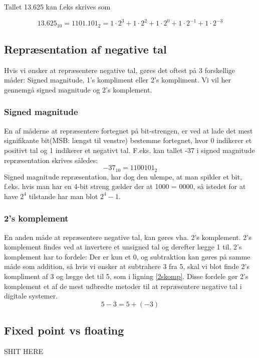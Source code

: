 Tallet 13.625 kan f.eks skrives som

\begin{equation}
13.625_{10} = 1101.101_2 = 1 \cdot 2^3+1 \cdot 2^2+1 \cdot 2^0+1 \cdot 2^{-1}+1 \cdot 2^{-3}
\end{equation}

\subsection{Repræsentation af negative tal}
Hvis vi ønsker at repræsentere negative tal, gøres det oftest på 3 forskellige måder: 
Signed magnitude, 1's kompliment eller 2's kompliment. Vi vil her gennemgå signed magnitude og 2's komplement.
\subsubsection{Signed magnitude}
En af måderne at repræsentere fortegnet på bit-strengen, er ved at lade det mest signifikante bit(MSB: længst til venstre) bestemme fortegnet, hvor 0 indikerer et positivt tal og 1 indikerer et negativt tal.  F.eks. kan tallet -37 i signed magnitude repræsentation skrives således:
\begin{equation}
-37_{10} = 1100101_2 
\end{equation}
Signed magnitude repræsentation, har dog den ulempe, at man spilder et bit, f.eks. hvis man har en 4-bit streng gælder der at 1000 =  0000, så istedet for at have $2^4$ tilstande har man blot $2^4-1$. 
\subsubsection{2's komplement}
En anden måde at repræsentere negative tal, kan gøres vha. 2's komplement. 2's komplement findes ved at invertere et unsigned tal og derefter lægge 1 til. 2's komplement har to fordele: Der er kun et 0, og subtraktion kan gøres på samme måde som addition, så hvis vi ønsker at subtrahere 3 fra 5, skal vi blot finde 2's kompliment af 3 og lægge det til 5, som i ligning \ref{2skomp}. Disse fordele gør 2's komplement et af de mest udbredte metoder til at repræsentere negative tal i digitale systemer.
\begin{equation}
\label{2skomp}
 5-3 = 5+(-3)
\end{equation}


\subsection{Fixed point vs floating}
SHIT HERE

